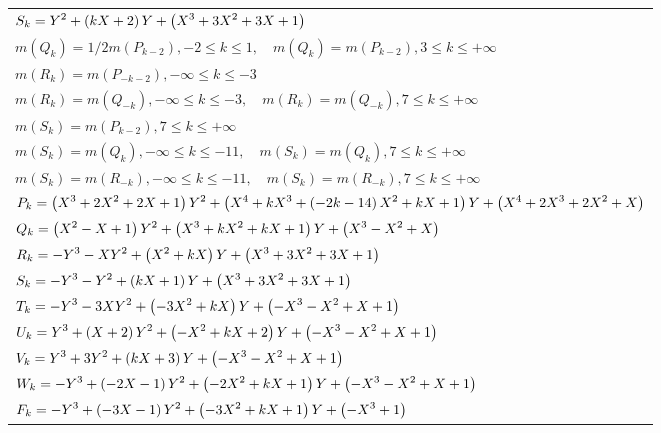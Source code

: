 \documentclass{amsart}
\begin{document}
\begin{longtable}{|l|}
\(\displaystyle S_k=Y^2
 + \left(k\*X
 + 2\right) \*Y
 + \left(X^3
 + 3\*X^2
 + 3\*X
 + 1\right) \)\\
\(\displaystyle m(Q_k) = 1/2m(P_{k
 - 2}),-2 \leqslant k \leqslant 1,\quad m(Q_k) = m(P_{k
 - 2}),3 \leqslant k \leqslant +\infty\)\\
\(\displaystyle m(R_k) = m(P_{-k
 - 2}),-\infty \leqslant k \leqslant -3\)\\
\(\displaystyle m(R_k) = m(Q_{-k}),-\infty \leqslant k \leqslant -3,\quad m(R_k) = m(Q_{-k}),7 \leqslant k \leqslant +\infty\)\\
\(\displaystyle m(S_k) = m(P_{k
 - 2}),7 \leqslant k \leqslant +\infty\)\\
\(\displaystyle m(S_k) = m(Q_{k}),-\infty \leqslant k \leqslant -11,\quad m(S_k) = m(Q_{k}),7 \leqslant k \leqslant +\infty\)\\
\(\displaystyle m(S_k) = m(R_{-k}),-\infty \leqslant k \leqslant -11,\quad m(S_k) = m(R_{-k}),7 \leqslant k \leqslant +\infty\)\\
\hline
\(\displaystyle P_k= \left(X^3
 + 2\*X^2
 + 2\*X
 + 1\right) \*Y^2
 + \left(X^4
 + k\*X^3
 + \left(-2\*k
 - 14\right) \*X^2
 + k\*X
 + 1\right) \*Y
 + \left(X^4
 + 2\*X^3
 + 2\*X^2
 + X\right) \)\\
\(\displaystyle Q_k= \left(X^2
 - X
 + 1\right) \*Y^2
 + \left(X^3
 + k\*X^2
 + k\*X
 + 1\right) \*Y
 + \left(X^3
 - X^2
 + X\right) \)\\
\(\displaystyle R_k=-Y^3
 - X\*Y^2
 + \left(X^2
 + k\*X\right) \*Y
 + \left(X^3
 + 3\*X^2
 + 3\*X
 + 1\right) \)\\
\(\displaystyle S_k=-Y^3
 - Y^2
 + \left(k\*X
 + 1\right) \*Y
 + \left(X^3
 + 3\*X^2
 + 3\*X
 + 1\right) \)\\
\(\displaystyle T_k=-Y^3
 - 3\*X\*Y^2
 + \left(-3\*X^2
 + k\*X\right) \*Y
 + \left(-X^3
 - X^2
 + X
 + 1\right) \)\\
\(\displaystyle U_k=Y^3
 + \left(X
 + 2\right) \*Y^2
 + \left(-X^2
 + k\*X
 + 2\right) \*Y
 + \left(-X^3
 - X^2
 + X
 + 1\right) \)\\
\(\displaystyle V_k=Y^3
 + 3\*Y^2
 + \left(k\*X
 + 3\right) \*Y
 + \left(-X^3
 - X^2
 + X
 + 1\right) \)\\
\(\displaystyle W_k=-Y^3
 + \left(-2\*X
 - 1\right) \*Y^2
 + \left(-2\*X^2
 + k\*X
 + 1\right) \*Y
 + \left(-X^3
 - X^2
 + X
 + 1\right) \)\\
\(\displaystyle F_k=-Y^3
 + \left(-3\*X
 - 1\right) \*Y^2
 + \left(-3\*X^2
 + k\*X
 + 1\right) \*Y
 + \left(-X^3
 + 1\right) \)\\

\end{longtable}
\end{document}
